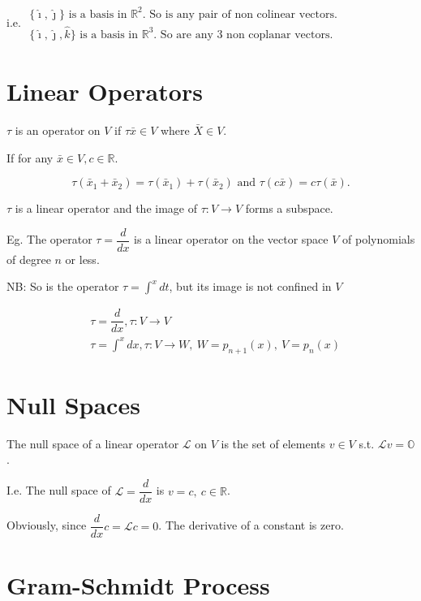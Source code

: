 \documentclass{report}
\begin{document}
i.e. $\begin{array}{l}
     \text{$\{\hat{\imath}, \hat{\jmath}\}$ is a basis in $\mathbb{R}^2$. So is any pair of non colinear vectors. } \\
     \text{$\{\hat{\imath}, \hat{\jmath}, \hat{k}\}$ is a basis in $\mathbb{R}^3$. So are any 3 non coplanar vectors.}
\end{array}$

\section{Linear Operators}

$\tau$ is an operator on $V$ if $\tau \bar{x} \in V$ where $\bar{X} \in V$.

If for any $\bar{x} \in V, c \in \mathbb{R}$.

$$
\tau\left(\bar{x}_1+\bar{x}_2\right)=\tau\left(\bar{x}_1\right)+\tau\left(\bar{x}_2\right) \text { and } \tau(c \bar{x})=c \tau(\bar{x}).
$$


$\tau$ is a linear operator and the image of $\tau: V \rightarrow V$ forms a subspace.

Eg. The operator $\tau=\dfrac{d}{d x}$ is a linear operator on the vector space $V$ of polynomials of degree $n$ or less.

NB: So is the operator $\tau=\displaystyle\int^{x} d t$, but its image is not confined in $V$

$$
\begin{aligned}
& \tau=\dfrac{d}{d x}, \tau: V \rightarrow V \\
& \tau=\displaystyle\int^{x} d x, \tau: V \rightarrow W,\ W=p_{n+1}(x),\ V=p_{n}(x)
\end{aligned}
$$

\section{Null Spaces}

The null space of a linear operator $\mathcal{L}$ on $V$ is the set of elements $v \in V$ s.t. $\mathcal{L} v=\mathbb{O}$.

I.e. The null space of $\mathcal{L}=\dfrac{d}{d x}$ is $v=c,\ c \in \mathbb{R}$.

Obviously, since $\dfrac{d}{d x} c=\mathcal{L} c=0$. The derivative of a constant is zero.

\section{Gram-Schmidt Process}
\end{document}
